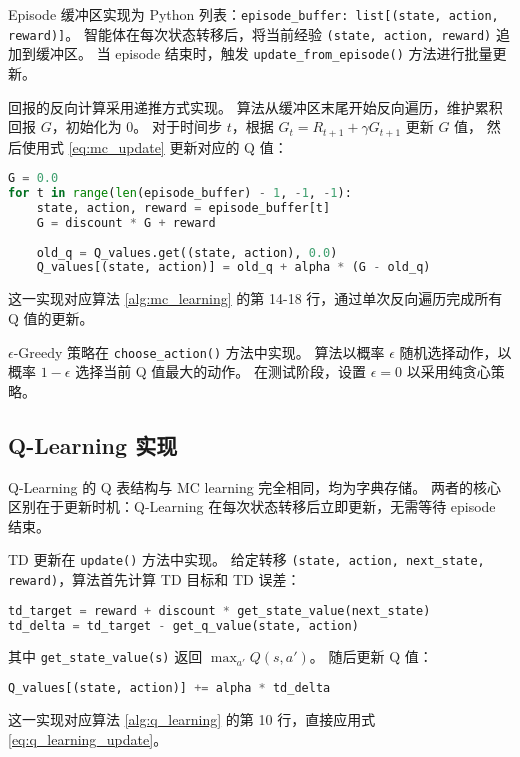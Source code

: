 Episode 缓冲区实现为 Python 列表：\texttt{episode\_buffer: list[(state, action, reward)]}。
智能体在每次状态转移后，将当前经验 \texttt{(state, action, reward)} 追加到缓冲区。
当 episode 结束时，触发 \texttt{update\_from\_episode()} 方法进行批量更新。

回报的反向计算采用递推方式实现。
算法从缓冲区末尾开始反向遍历，维护累积回报 $G$，初始化为 0。
对于时间步 $t$，根据 $G_t = R_{t+1} + \gamma G_{t+1}$ 更新 $G$ 值，
然后使用式 \eqref{eq:mc_update} 更新对应的 Q 值：
\begin{lstlisting}[language=Python, basicstyle=\small\ttfamily]
G = 0.0
for t in range(len(episode_buffer) - 1, -1, -1):
    state, action, reward = episode_buffer[t]
    G = discount * G + reward
    
    old_q = Q_values.get((state, action), 0.0)
    Q_values[(state, action)] = old_q + alpha * (G - old_q)
\end{lstlisting}
这一实现对应算法 \ref{alg:mc_learning} 的第 14-18 行，通过单次反向遍历完成所有 Q 值的更新。

$\epsilon$-Greedy 策略在 \texttt{choose\_action()} 方法中实现。
算法以概率 $\epsilon$ 随机选择动作，以概率 $1-\epsilon$ 选择当前 Q 值最大的动作。
在测试阶段，设置 $\epsilon = 0$ 以采用纯贪心策略。

\subsection{Q-Learning 实现}

Q-Learning 的 Q 表结构与 MC learning 完全相同，均为字典存储。
两者的核心区别在于更新时机：Q-Learning 在每次状态转移后立即更新，无需等待 episode 结束。


TD 更新在 \texttt{update()} 方法中实现。
给定转移 \texttt{(state, action, next\_state, reward)}，算法首先计算 TD 目标和 TD 误差：
\begin{lstlisting}[language=Python, basicstyle=\small\ttfamily]
td_target = reward + discount * get_state_value(next_state)
td_delta = td_target - get_q_value(state, action)
\end{lstlisting}
其中 \texttt{get\_state\_value(s)} 返回 $\max_{a'} Q(s, a')$。
随后更新 Q 值：
\begin{lstlisting}[language=Python, basicstyle=\small\ttfamily]
Q_values[(state, action)] += alpha * td_delta
\end{lstlisting}
这一实现对应算法 \ref{alg:q_learning} 的第 10 行，直接应用式 \eqref{eq:q_learning_update}。

